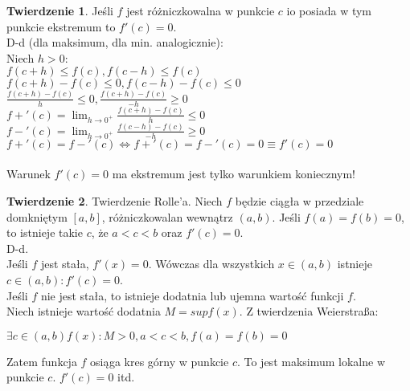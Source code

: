 \documentclass{article}
\theoremstyle{definition}
\theoremstyle{definition}
\newtheorem{tw}{Twierdzenie}[subsection]
\theoremstyle{definition}
\theoremstyle{definition}
\begin{document}
    \begin{tw}
    Jeśli $f$ jest różniczkowalna w punkcie $c$ io posiada w tym punkcie ekstremum to $f'(c)=0$.\\
    D-d (dla maksimum, dla min. analogicznie):\\
    Niech $h>0$:\\
    $f(c+h)\leq f(c), f(c-h)\leq f(c)$\\
    $f(c+h)-f(c)\leq 0, f(c-h) - f(c) \leq 0$\\
    $\frac{f(c+h)-f(c)}{h}\leq 0, \frac{f(c+h)-f(c)}{-h}\geq 0$\\
    $f+'(c)=\lim_{h\rightarrow 0^+} \frac{f(c+h)-f(c)}{h}\leq 0$\\
    $f-'(c)=\lim_{h\rightarrow 0^+} \frac{f(c-h)-f(c)}{-h}\geq 0$\\
    $f+'(c)=f-'(c)\iff f+'(c)=f-'(c)=0 \equiv f'(c)=0$\\\\
    Warunek $f'(c)=0$ ma ekstremum jest tylko warunkiem koniecznym!
    \end{tw}
    
    \begin{tw}
        Twierdzenie Rolle'a. Niech $f$ będzie ciągła w przedziale domkniętym $[a,b]$, różniczkowalan wewnątrz $(a,b)$. Jeśli $f(a)=f(b)=0$, to istnieje takie $c$, że $a<c<b$ oraz $f'(c)=0$.\\
        D-d.\\
        Jeśli $f$ jest stała, $f'(x)=0$. Wówczas dla wszystkich $x\in(a,b)$ istnieje $c\in(a,b) : f'(c)=0$.\\
        Jeśli $f$ nie jest stała, to istnieje dodatnia lub ujemna wartość funkcji $f$.\\
        Niech istnieje wartość dodatnia $M=sup f(x)$. Z twierdzenia Weierstraßa:
        \begin{center}
            $\exists c\in(a,b) f(x) : M>0, a<c<b, f(a)=f(b)=0$
        \end{center}
        Zatem funkcja $f$ osiąga kres górny w punkcie $c$. To jest maksimum lokalne w punkcie $c$. $f'(c)=0$ itd.
    \end{tw}
    
\end{document}
